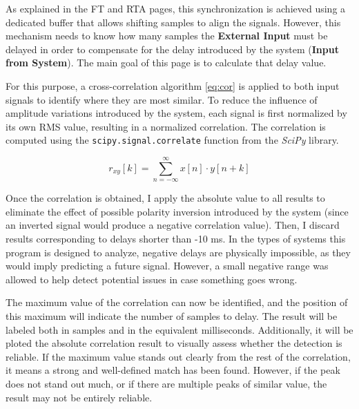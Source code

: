 As explained in the FT and RTA pages, this synchronization is achieved using a dedicated buffer that allows shifting samples to align the signals. However, this mechanism needs to know how many samples the \textbf{External Input} must be delayed in order to compensate for the delay introduced by the system (\textbf{Input from System}). The main goal of this page is to calculate that delay value.

For this purpose, a cross-correlation algorithm \ref{eq:cor} is applied to both input signals to identify where they are most similar. To reduce the influence of amplitude variations introduced by the system, each signal is first normalized by its own RMS value, resulting in a normalized correlation. The correlation is computed using the \texttt{scipy.signal.correlate} function from the \textit{SciPy} library.

\begin{equation}
	\label{eq:cor}
	r_{xy}[k] = \sum_{n=-\infty}^{\infty} x[n] \cdot y[n + k]
\end{equation}


Once the correlation is obtained, I apply the absolute value to all results to eliminate the effect of possible polarity inversion introduced by the system (since an inverted signal would produce a negative correlation value). Then, I discard results corresponding to delays shorter than -10 ms. In the types of systems this program is designed to analyze, negative delays are physically impossible, as they would imply predicting a future signal. However, a small negative range was allowed to help detect potential issues in case something goes wrong.

The maximum value of the correlation can now be identified, and the position of this maximum will indicate the number of samples to delay. The result will be labeled both in samples and in the equivalent milliseconds. Additionally, it will be ploted the absolute correlation result to visually assess whether the detection is reliable. If the maximum value stands out clearly from the rest of the correlation, it means a strong and well-defined match has been found. However, if the peak does not stand out much, or if there are multiple peaks of similar value, the result may not be entirely reliable.

